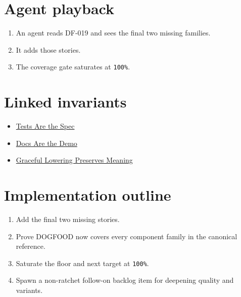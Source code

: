 \section{Agent playback}\label{record-081-agent-playback}

\begin{enumerate}
\def\labelenumi{\arabic{enumi}.}
\tightlist
\item
  An agent reads DF-019 and sees the final two missing families.
\item
  It adds those stories.
\item
  The coverage gate saturates at \texttt{1\allowbreak{}0\allowbreak{}0\allowbreak{}\%}.
\end{enumerate}

\section{Linked invariants}\label{record-081-linked-invariants}

\begin{itemize}
\tightlist
\item
  \href{https://github.com/flyingrobots/bijou/blob/cbd70612140e7a450d764b3c7be1c6af878b99bc/docs/invariants/tests-are-the-spec.md}{Tests Are the Spec}
\item
  \href{https://github.com/flyingrobots/bijou/blob/cbd70612140e7a450d764b3c7be1c6af878b99bc/docs/invariants/docs-are-the-demo.md}{Docs Are the Demo}
\item
  \href{https://github.com/flyingrobots/bijou/blob/cbd70612140e7a450d764b3c7be1c6af878b99bc/docs/invariants/graceful-lowering-preserves-meaning.md}{Graceful Lowering Preserves Meaning}
\end{itemize}

\section{Implementation outline}\label{record-081-implementation-outline}

\begin{enumerate}
\def\labelenumi{\arabic{enumi}.}
\tightlist
\item
  Add the final two missing stories.
\item
  Prove DOGFOOD now covers every component family in the canonical reference.
\item
  Saturate the floor and next target at \texttt{1\allowbreak{}0\allowbreak{}0\allowbreak{}\%}.
\item
  Spawn a non-ratchet follow-on backlog item for deepening quality and variants.
\end{enumerate}

